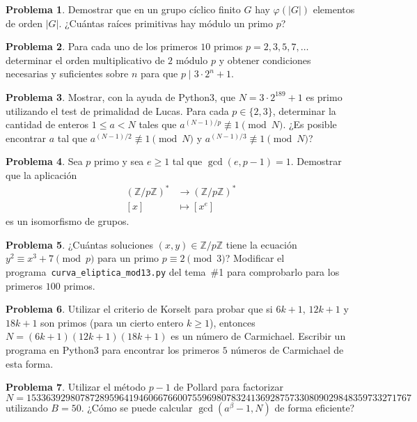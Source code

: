 \documentclass[a4paper, 11pt]{article}
\newcommand{\ZZ}{\mathbb{Z}}
\newcounter{numerodetema}
\theoremstyle{plain}
\theoremstyle{definition}
\newtheorem{prob}{Problema}[numerodetema]
\begin{document}
\begin{prob}
Demostrar que en un grupo cíclico finito $G$ hay $\varphi(|G|)$ elementos
de orden $|G|$. ¿Cuántas raíces primitivas hay módulo un primo $p$?
\end{prob}

\begin{prob}
Para cada uno de los primeros $10$ primos $p=2,3,5,7,\ldots$ determinar
el orden multiplicativo de $2$ módulo $p$ y obtener condiciones necesarias
y suficientes sobre $n$ para que $p\mid 3\cdot2^n+1$.
\end{prob}

\begin{prob}\label{prob-p}
Mostrar, con la ayuda de Python3, que $N=3\cdot 2^{189}+1$ es primo
utilizando el test de primalidad de Lucas. Para cada $p\in\{2,3\}$, determinar
la cantidad de enteros $1\leq a<N$ tales que $a^{(N-1)/p}\not\equiv1\pmod{N}$.
¿Es posible encontrar $a$ tal que $a^{(N-1)/2}\not\equiv1\pmod{N}$ y
$a^{(N-1)/3}\not\equiv1\pmod{N}$?
\end{prob}

\begin{prob}
Sea $p$ primo y sea $e\geq1$ tal que $\gcd(e,p-1)=1$. Demostrar que la
aplicación
\[
\begin{aligned}
   (\ZZ/p\ZZ)^* & \rightarrow(\ZZ/p\ZZ)^* \\
   [x] &\mapsto [x^e]
\end{aligned}
\]
es un isomorfismo de grupos.
\end{prob}

\begin{prob}
¿Cuántas soluciones $(x,y)\in\ZZ/p\ZZ$ tiene la ecuación
$y^2\equiv x^3+7\pmod{p}$ para un primo $p\equiv 2\pmod{3}$?
Modificar el programa~\texttt{curva\_eliptica\_mod13.py} del tema~\#1 para comprobarlo
para los primeros $100$ primos.
\end{prob}

\begin{prob}
Utilizar el criterio de Korselt para probar que si $6k+1$, $12k+1$ y $18k+1$
son primos (para un cierto entero $k\geq 1$), entonces $N=(6k+1)(12k+1)(18k+1)$
es un número de Carmichael. Escribir un programa en Python3 para encontrar
los primeros $5$ números de Carmichael de esta forma.
\end{prob}

\begin{prob}
Utilizar el método $p-1$ de Pollard para factorizar
\[
  N=1533639298078728959641946066766007559698078324136928757330809029848359733271767
\]
utilizando $B=50$. ¿Cómo se puede calcular $\gcd(a^\beta-1,N)$ de forma
eficiente?
\end{prob}
\end{document}
